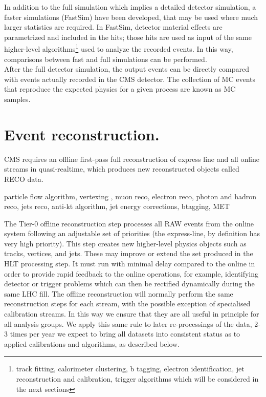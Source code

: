 \noindent In addition to the full simulation which implies a detailed detector simulation, a faster simulations (FastSim) have been developed, that may be used where much larger statistics are required. In FastSim, detector material effects are parametrized and included in the hits; those hits are used as input of the same higher-level algorithms\footnote{track fitting, calorimeter clustering, b tagging, electron identification, jet reconstruction and calibration, trigger algorithms which will be considered in the next sections} used to analyze the recorded events. In this way, comparisons between fast and full simulations can be performed\cite{fastsim}.\\

\noindent After the full detector simulation, the output events can be directly compared  with events actually recorded in the CMS detector. The collection of MC events that reproduce the expected physics for a given process are known as MC samples.\\   

\section{Event reconstruction.}





CMS requires an offline first-pass full reconstruction of express line and all
online streams in quasi-realtime, which produces new reconstructed objects
called RECO data.




particle flow algorithm, vertexing , muon reco, electron reco, photon and hadron reco, jets reco, anti-kt algorithm, jet energy corrections, btagging, MET 





The Tier-0 offline reconstruction step processes all RAW events from the online system following
an adjustable set of priorities (the express-line, by definition has very high priority). This step
creates new higher-level physics objects such as tracks, vertices, and jets. These may improve or
extend the set produced in the HLT processing step. It must run with minimal delay compared
to the online in order to provide rapid feedback to the online operations, for example, identifying
detector or trigger problems which can then be rectified dynamically during the same LHC fill.
The offline reconstruction will normally perform the same reconstruction steps for each stream,
with the possible exception of specialised calibration streams. In this way we ensure that they
are all useful in principle for all analysis groups. We apply this same rule to later re-processings
of the data, 2-3 times per year we expect to bring all datasets into consistent status as to applied
calibrations and algorithms, as described below.





